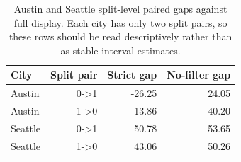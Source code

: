 \begin{table}[t]
\centering
\small
\setlength{\tabcolsep}{4pt}
\caption{Austin and Seattle split-level paired gaps against full display. Each city has only two split pairs, so these rows should be read descriptively rather than as stable interval estimates.}
\label{tab:city_split_gap_summary}
\begin{tabular}{@{}lrrr@{}}
\hline
City & Split pair & Strict gap & No-filter gap \\
\hline
Austin & 0->1 & -26.25 & 24.05 \\
Austin & 1->0 & 13.86 & 40.20 \\
Seattle & 0->1 & 50.78 & 53.65 \\
Seattle & 1->0 & 43.06 & 50.26 \\
\hline
\end{tabular}
\end{table}
